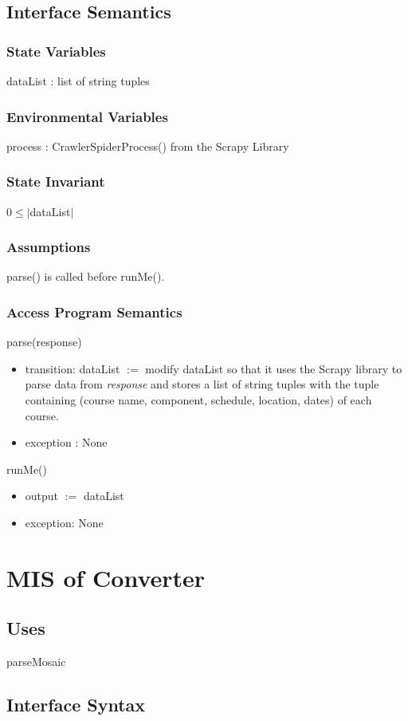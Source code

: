\documentclass[12pt, titlepage]{article}
\begin{document}
\subsection{Interface Semantics}
\subsubsection{State Variables}
dataList : list of string tuples
\subsubsection{Environmental Variables}
process : CrawlerSpiderProcess() from the Scrapy Library %
\subsubsection{State Invariant}
$0 \le |$dataList$|$
\subsubsection{Assumptions}
parse() is called before runMe().
\subsubsection{Access Program Semantics}
parse(response)
\begin{itemize}
    \item transition: dataList $:= $ modify dataList so that it uses the Scrapy library to parse data from \emph{response} and stores a list of string tuples with the tuple containing (course name, component, schedule, location, dates) of each course.
    \item exception : None
\end{itemize}
runMe()
\begin{itemize}
    \item output $:= $ dataList 
    \item exception: None
\end{itemize}

\section{MIS of Converter} \label{SecM1}
\subsection{Uses}
parseMosaic

\subsection{Interface Syntax}
\end{document}
